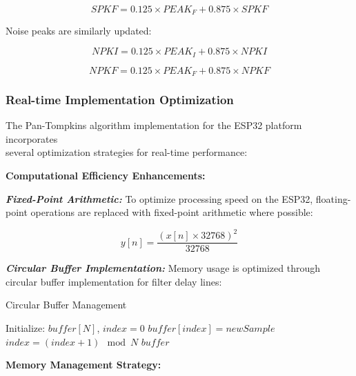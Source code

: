 \documentclass[12pt,a4paper]{article}
\begin{document}
\begin{equation*}
SPKF = 0.125 \times PEAK_F + 0.875 \times SPKF
\end{equation*}

Noise peaks are similarly updated:

\begin{equation*}
NPKI = 0.125 \times PEAK_I + 0.875 \times NPKI
\end{equation*}

\begin{equation*}
NPKF = 0.125 \times PEAK_F + 0.875 \times NPKF
\end{equation*}

\subsubsection{Real-time Implementation Optimization}

The Pan-Tompkins algorithm implementation for the ESP32 platform incorporates \\ several optimization strategies for real-time performance:

\vspace{0.5cm}

\textbf{Computational Efficiency Enhancements:}

\textbf{\textit{Fixed-Point Arithmetic:}}
To optimize processing speed on the ESP32, floating-point operations are replaced with fixed-point arithmetic where possible:

\begin{equation*}
y[n] = \frac{(x[n] \times 32768)^2}{32768}
\end{equation*}

\textbf{\textit{Circular Buffer Implementation:}}
Memory usage is optimized through circular buffer implementation for filter delay lines:

\begin{algorithm}
\caption{Circular Buffer Management}
\begin{algorithmic}
\STATE Initialize: $buffer[N]$, $index = 0$
    \STATE $buffer[index] = newSample$
    \STATE $index = (index + 1) \mod N$
    \RETURN $buffer$
\ENDPROCEDURE
\end{algorithmic}
\end{algorithm}

\vspace{0.5cm}

\newpage

\textbf{Memory Management Strategy:}
\end{document}
